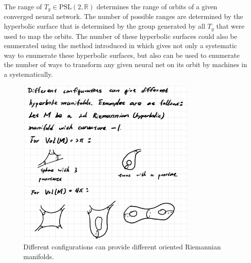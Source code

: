 \documentclass{article}
\theoremstyle{plain}
\theoremstyle{plain} %
\theoremstyle{definition}  %
\theoremstyle{remark}  %
\theoremstyle{plain}
\begin{document}
The range of $T_g\in\text{PSL}(2,\mathbb{R})$ determines the range of orbits of a given converged neural network. The number of possible ranges are determined by the hyperbolic surface that is determined by the group generated by all $T_g$ that were used to map the orbits. The number of these hyperbolic surfaces could also be enumerated using the method introduced in\cite{chuang2015implications} which gives not only a systematic way to enumerate these hyperbolic surfaces, but also can be used to enumerate the number of ways to transform any given neural net on its orbit by machines in a systematically.

\begin{figure}[H]
\centering
\includegraphics[width=0.8\textwidth]{13.png}
\caption{Different configurations can provide different oriented Riemannian manifolds.}
\end{figure}
\end{document}
